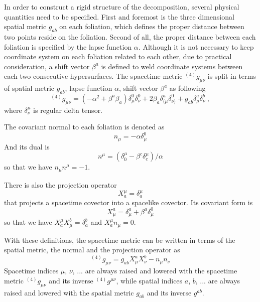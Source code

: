 In order to  construct a rigid structure of the decomposition, several physical quantities need to be specified. First and foremost is the three dimensional spatial metric $g_{ab}$ on each foliation, which defines the proper distance between two points reside on the foliation. Second of all, the proper distance between each foliation is specified by the lapse function $\alpha$. Although it is not necessary to keep coordinate system on each foliation related to each other, due to practical consideration, a shift vector $\beta^{a}$ is defined to weld coordinate systems between each two consecutive hypersurfaces. The spacetime metric $^{(4)}g_{\mu\nu}$ is split in terms of spatial metric $g_{ab}$, lapse function $\alpha$, shift vector $\beta^{a}$ as following
\begin{equation}
	{}^{\left(4\right)}g_{\mu\nu} = \left(-\alpha^2 + \beta^{a}\beta_{a}\right)\delta_\mu^0\delta_\nu^0 
	+ 2\beta_{a}\delta_{(\mu}^a\delta_{\nu)}^0 + g_{ab} \delta^a_\mu \delta^b_\nu \ ,
\end{equation}
where $\delta^{\mu}_{\nu}$ is regular delta tensor. 

The covariant normal to each foliation is denoted as
\begin{equation}\label{normal covector}
n_{\mu} = -\alpha\delta^{0}_{\mu}
\end{equation}
 And its dual is
\begin{equation}\label{normal vector}
n^{\mu} = \left(\delta^{\mu}_{0} - \beta^{c}\delta^{\mu}_{c}\right)/\alpha
\end{equation}
so that we have $n_{\mu}n^{\mu} = -1$. 

There is also the projection operator
\begin{equation}\label{projection 1}
X^{\mu}_{a} = \delta^{\mu}_{a}
\end{equation}
that projects a spacetime covector into a spacelike covector. Its covariant form is
\begin{equation}\label{projection 2}
X^{a}_{\mu} = \delta^{a}_{\mu} + \beta^{a}\delta^{0}_{\mu}
\end{equation}
so that we have $X^{\mu}_{a}X^{b}_{\mu} = \delta^{b}_{a}$ and $X^{\mu}_{a}n_{\mu} = 0$. 

With these definitions, the spacetime metric can be written in terms of the spatial metric, the normal and the projection operator as
\begin{equation}\label{spacetime metric 3 + 1}
^{\left(4\right)}g_{\mu\nu} = g_{ab}X^{a}_{\mu}X^{b}_{\nu} - n_{\mu}n_{\nu}
\end{equation}
Spacetime indices $\mu$, $\nu$, ... are always raised and lowered with the spacetime metric $^{\left(4\right)}g_{\mu\nu}$ and its inverse $^{\left(4\right)}g^{\mu\nu}$, while spatial indices $a$, $b$, ... are always raised and lowered with the spatial metric $g_{ab}$ and its inverse $g^{ab}$. 

